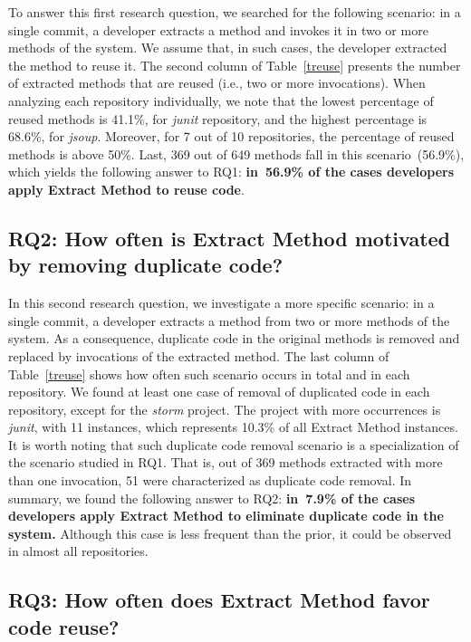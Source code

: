 To answer this first research question, we searched for the following scenario: in a single commit, a developer extracts a method and invokes it in two or more methods of the system. We assume that, in such cases, the developer extracted the method to reuse it.
The second column of Table~\ref{treuse} presents the number of extracted methods that are reused (i.e., two or more invocations).
When analyzing each repository individually, we note that the lowest percentage of reused methods is 41.1\%, for \textit{junit} repository, and the highest percentage is 68.6\%, for \textit{jsoup}. Moreover, for 7 out of 10 repositories, the percentage of reused methods is above 50\%.
Last, 369 out of 649 methods fall in this scenario~(56.9\%), which yields the following answer to RQ1: \textbf{in~56.9\% of the cases developers apply Extract Method to reuse code}.


\subsection{RQ2: How often is Extract Method motivated by removing duplicate code?}


In this second research question, we investigate a more specific scenario: in a single commit, a developer extracts a method from two or more methods of the system. As a consequence, duplicate code in the original methods is removed and replaced by invocations of the extracted method.
The last column of Table~\ref{treuse} shows how often such scenario occurs in total and in each repository.
We found at least one case of removal of duplicated code in each repository, except for the \textit{storm} project. The project with more occurrences is \textit{junit}, with 11 instances, which represents 10.3\% of all Extract Method instances. 
It is worth noting that such duplicate code removal scenario is a specialization of the scenario studied in RQ1.
That is, out of 369 methods extracted with more than one invocation, 51 were characterized as duplicate code removal.
In summary, we found the following answer to RQ2:  \textbf{in~7.9\% of the cases developers apply Extract Method to eliminate duplicate code in the system.} Although this case is less frequent than the prior, it could be observed in almost all repositories.


\subsection{RQ3: How often does Extract Method favor code reuse?}

